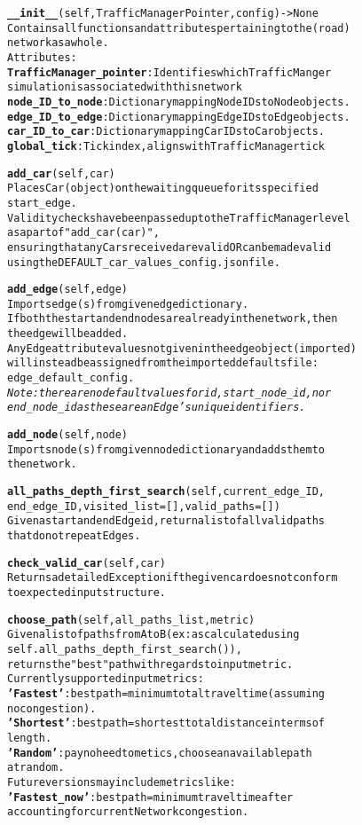 \begin{alltt}
\textbf{__init__}(self, TrafficManagerPointer, config) -> None
Contains all functions and attributes pertaining to the (road) 
network as a whole.
Attributes:
    \textbf{TrafficManager_pointer}:  Identifies which TrafficManger 
    simulation is associated with this network
    \textbf{node_ID_to_node}:  Dictionary mapping Node IDs to Node objects.
    \textbf{edge_ID_to_edge}:  Dictionary mapping Edge IDs to Edge objects.
    \textbf{car_ID_to_car}:  Dictionary mapping Car IDs to Car objects.
    \textbf{global_tick}:  Tick index, aligns with TrafficManager tick

\textbf{add_car}(self, car)
Places Car (object) on the waiting queue for its specified 
start_edge.
Validity checks have been passed up to the TrafficManager level 
as a part of "add_car(car)",
ensuring that any Cars received are valid OR can be made valid 
using the DEFAULT_car_values_config.json file.

\textbf{add_edge}(self, edge)
Imports edge(s) from given edge dictionary.
If both the start and end nodes are already in the network, then 
the edge will be added.
Any Edge attribute values not given in the edge object (imported) 
will instead be assigned from the imported defaults file:
edge_default_config.
\textit{Note:  there are no default values for id, start_node_id, nor 
end_node_id as these are an Edge's unique identifiers.}

\textbf{add_node}(self, node)
Imports node(s) from given node dictionary and adds them to 
the network.

\textbf{all_paths_depth_first_search}(self, current_edge_ID, 
end_edge_ID, visited_list=[], valid_paths=[])
Given a start and end Edge id, return a list of all valid paths 
that do not repeat Edges.

\textbf{check_valid_car}(self, car)
Returns a detailed Exception if the given car does not conform 
to expected input structure.

\textbf{choose_path}(self, all_paths_list, metric)
Given a list of paths from A to B (ex: as calculated using
self.all_paths_depth_first_search()),
returns the "best" path with regards to input metric.
Currently supported input metrics:
    \textbf{'Fastest'}: best path = minimum total travel time (assuming 
    no congestion).
    \textbf{'Shortest'}: best path = shortest total distance in terms of 
    length.
    \textbf{'Random'}:  pay no heed to metics, choose an available path 
    at random.
Future versions may include metrics like:
    \textbf{'Fastest_now'}: best path = minimum travel time after 
    accounting for current Network congestion.


\end{alltt}

